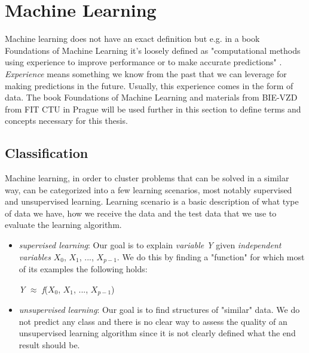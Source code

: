 \section{Machine Learning}

Machine learning does not have an exact definition but e.g. in a book Foundations of Machine Learning it's loosely defined as "computational methods using experience to improve performance or to make accurate predictions" \cite{ml-foundations}. \textit{Experience} means something we know from the past that we can leverage for making predictions in the future. Usually, this experience comes in the form of data. The book Foundations of Machine Learning \cite{ml-foundations} and materials from BIE-VZD from FIT CTU in Prague \cite{vzd-lectures} will be used further in this section to define terms and concepts necessary for this thesis.

\subsection{Classification}

Machine learning, in order to cluster problems that can be solved in a similar way, can be categorized into a few learning scenarios, most notably supervised and unsupervised learning. Learning scenario is a basic description of what type of data we have, how we receive the data and the test data that we use to evaluate the learning algorithm.

\begin{itemize}
    \item \textit{supervised learning}: Our goal is to explain \textit{variable Y} given \textit{independent variables} $\textit{X}_0$, $\textit{X}_1$, ..., $\textit{X}_{\textit{p} - 1}$. We do this by finding a "function" for which most of its examples the following holds:\\
    \centerline{\textit{Y} $\approx$ \textit{f}($\textit{X}_0$, $\textit{X}_1$, ..., $\textit{X}_{\textit{p} - 1}$)}
    \item \textit{unsupervised learning}: Our goal is to find structures of "similar" data. We do not predict any class and there is no clear way to assess the quality of an unsupervised learning algorithm since it is not clearly defined what the end result should be.
\end{itemize}

